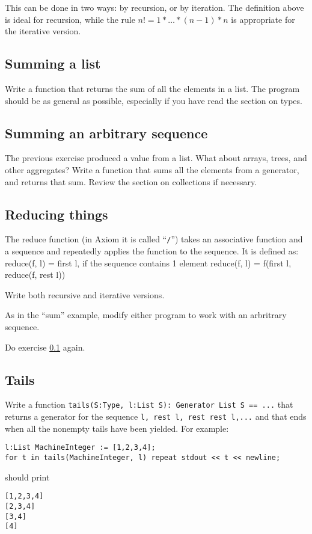 \documentclass{article}
\begin{document}
This can be done in two ways: by recursion, or by iteration.  The
definition above is ideal for recursion, while the rule
$ n! = 1*\ldots{}*(n-1)*n $ is appropriate for the iterative version.

\subsection{Summing a list}
\label{ExSumAList}

Write a function that returns the sum of all the elements in a list.
The program should be as general as possible, especially if you have
read the section on types.

\subsection{Summing an arbitrary sequence}

The previous exercise produced a value from a list.  What about
arrays, trees, and other aggregates?  Write a function that sums all
the elements from a generator, and returns that sum.  Review the
section on collections if necessary.


\subsection{Reducing things}

The reduce function (in Axiom it is called ``{\tt /}'') takes an
associative function and a sequence and repeatedly applies the
function to the sequence.  It is defined as: reduce(f, l) = first l,
if the sequence contains 1 element
reduce(f, l) = f(first l, reduce(f, rest l))

Write both recursive and iterative versions.

As in the ``sum'' example, modify either program to work with an
arbritrary sequence.

Do exercise \ref{ExSumAList} again.

\subsection{Tails}
\label{ExTails}
Write a function {\tt tails(S:Type, l:List S): Generator List S == ...}
that returns a generator for the sequence {\tt l, rest l, rest rest l,...}
and that ends when all the nonempty tails have been yielded. For example:
\begin{small}
\begin{verbatim}
l:List MachineInteger := [1,2,3,4];
for t in tails(MachineInteger, l) repeat stdout << t << newline;
\end{verbatim}
\end{small}
should print
\begin{small}
\begin{verbatim}
[1,2,3,4]
[2,3,4]
[3,4]
[4]
\end{verbatim}
\end{small}
\end{document}

